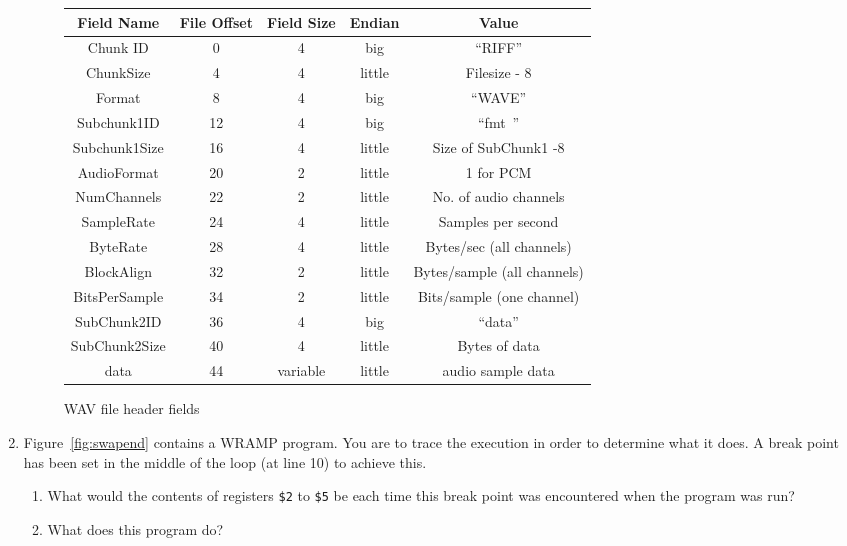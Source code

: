\documentclass[a4paper,10pt]{article}
\begin{document}
\begin{enumerate}
\begin{figure}[h]
  \begin{center}
\begin{tabular}{|c|c|c|c|c|}
	\hline
	Field Name 	& File Offset & Field Size & Endian & Value \\ \hline
	Chunk ID	& 0 	& 4	& big		& ``RIFF'' \\ \hline
	ChunkSize 	& 4	& 4	& little	& Filesize - 8 \\ \hline
	Format 		& 8	& 4	& big		& ``WAVE'' \\ \hline
	Subchunk1ID 	& 12	& 4	& big		& ``fmt\ '' \\  \hline
	Subchunk1Size 	& 16	& 4	& little	& Size of SubChunk1 -8 \\ \hline
	AudioFormat 	& 20	& 2	& little	& 1 for PCM \\ \hline
	NumChannels 	& 22	& 2	& little	& No. of audio channels \\ \hline
	SampleRate 	& 24	& 4	& little	& Samples per second \\ \hline
	ByteRate 	& 28	& 4	& little	& Bytes/sec (all channels) \\ \hline
	BlockAlign 	& 32	& 2	& little	& Bytes/sample (all channels) \\ \hline
	BitsPerSample 	& 34 	& 2	& little	& Bits/sample (one channel) \\ \hline
	SubChunk2ID 	& 36	& 4	& big		& ``data'' \\ \hline
	SubChunk2Size 	& 40	& 4	& little	&  Bytes of data \\ \hline
	data 		& 44	& variable & little	&  audio sample
	data \\ \hline
  \end{tabular}
  \caption{WAV file header fields}
  \label{fig:wavheader}
  \end{center}
\end{figure}

\newpage 

\item
\label{ques:swapend}

Figure~\ref{fig:swapend} contains a WRAMP program. You are to trace
the execution in order to determine what it does.  A break point has
been set in the middle of the loop (at line 10) to achieve this.

\begin{enumerate} 
\item What would the contents of registers \texttt{\$2} to \texttt{\$5} be each time this
break point was encountered when the program was run?
\item What does this program do?
\end{enumerate}


\end{enumerate}
\end{document}
